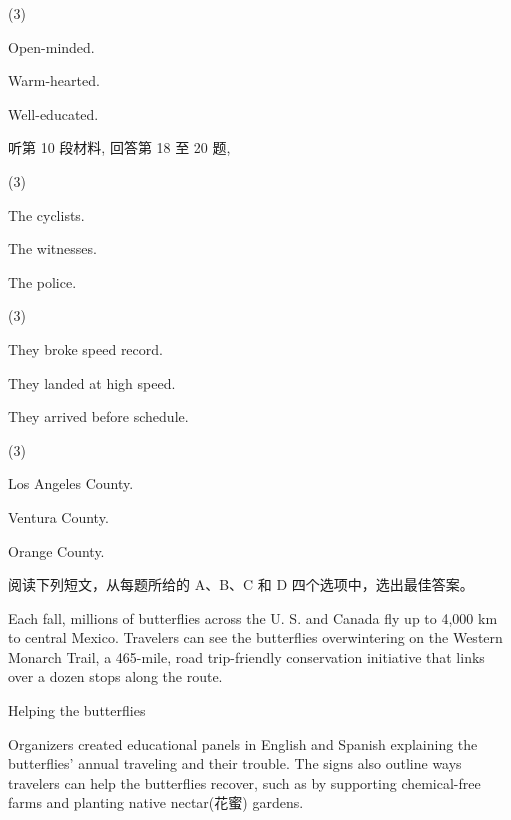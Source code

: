 \documentclass{英语试卷}
\begin{document}
\begin{choices}(3)
  \item Open-minded.
  \item Warm-hearted.
  \item Well-educated.
\end{choices}
\par 听第 10 段材料, 回答第 18 至 20 题,\par
{}
\begin{choices}(3)
  \item The cyclists.
  \item The witnesses.
  \item The police.
\end{choices}
\begin{choices}(3)
  \item They broke speed record.
  \item They landed at high speed.
  \item They arrived before schedule.
\end{choices}
\begin{choices}(3)
  \item Los Angeles County.
  \item Ventura County.
  \item Orange County.
\end{choices}
\par 阅读下列短文，从每题所给的 A、B、C 和 D 四个选项中，选出最佳答案。\par
{}
\par Each fall, millions of butterflies across the U. S. and Canada fly up to 4,000 km to central Mexico. Travelers can see the butterflies overwintering on the Western Monarch Trail, a 465-mile, road trip-friendly conservation initiative that links over a dozen stops along the route.\par
\par Helping the butterflies\par
\par Organizers created educational panels in English and Spanish explaining the butterflies' annual traveling and their trouble. The signs also outline ways travelers can help the butterflies recover, such as by supporting chemical-free farms and planting native nectar(花蜜) gardens.\par
\end{document}

